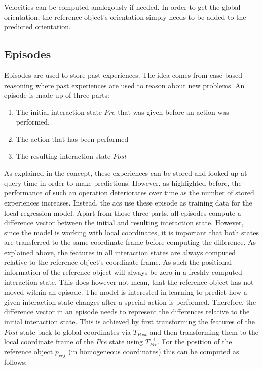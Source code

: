 Velocities can be computed analogously if needed.
In order to get the global orientation, the reference object's orientation simply needs to be added to the predicted orientation. 

\subsection{Episodes \label{sec:episodes}}

Episodes are used to store past experiences. The idea comes from case-based-reasoning \cite{cbr} where past experiences are used to reason about new problems. An episode is made up of three parts: 
\begin{enumerate}
\item The initial interaction state $Pre$ that was given before an action was performed.
\item The action that has been performed
\item The resulting interaction state $Post$ 
\end{enumerate}

As explained in the concept, these experiences can be stored and looked up at query time in order to make predictions. However, as highlighted before, the performance of such an operation deteriorates over time as the number of stored experiences increases. Instead, the \glspl{ac} use these episode as training data for the local regression model. Apart from those three parts, all episodes compute a difference vector between the initial and resulting interaction state. 
However, since the model is working with local coordinates, it is important that both states are transferred to the same coordinate frame before computing the difference. As explained above, the features in all interaction states are always computed relative to the reference object's coordinate frame. As such the positional information of the reference object will always be zero in a freshly computed interaction state. This does however not mean, that the reference object has not moved within an episode. The model is interested in learning to predict how a given interaction state changes after a special action is performed. Therefore, the difference vector in an episode needs to represent the differences relative to the initial interaction state. This is achieved by first transforming the features of the $Post$ state back to global coordinates via $T_{Post}$ and then transforming them to the local coordinate frame of the $Pre$ state using $T^{-1}_{Pre}$. For the position of the reference object $p_{ref}$ (in homogeneous coordinates) this can be computed as follows:

